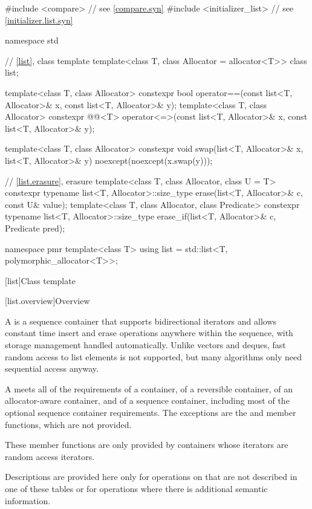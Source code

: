 %
\begin{codeblock}
#include <compare>              // see \ref{compare.syn}
#include <initializer_list>     // see \ref{initializer.list.syn}

namespace std {
  // \ref{list}, class template 
  template<class T, class Allocator = allocator<T>> class list;

  template<class T, class Allocator>
    constexpr bool operator==(const list<T, Allocator>& x, const list<T, Allocator>& y);
  template<class T, class Allocator>
    constexpr @@<T>
      operator<=>(const list<T, Allocator>& x, const list<T, Allocator>& y);

  template<class T, class Allocator>
    constexpr void swap(list<T, Allocator>& x, list<T, Allocator>& y)
      noexcept(noexcept(x.swap(y)));

  // \ref{list.erasure}, erasure
  template<class T, class Allocator, class U = T>
    constexpr typename list<T, Allocator>::size_type
      erase(list<T, Allocator>& c, const U& value);
  template<class T, class Allocator, class Predicate>
    constexpr typename list<T, Allocator>::size_type
      erase_if(list<T, Allocator>& c, Predicate pred);

  namespace pmr {
    template<class T>
      using list = std::list<T, polymorphic_allocator<T>>;
  }
}
\end{codeblock}

[list]{Class template }

[list.overview]{Overview}

\pnum
{}%
A
is a sequence container that supports
bidirectional iterators and allows constant time insert and erase
operations anywhere within the sequence, with storage management handled
automatically. Unlike vectors and deques,
fast random access to list elements is not supported, but many
algorithms only need sequential access anyway.

\pnum
A  meets all of the requirements
of a container,
of a reversible container,
of an allocator-aware container, and
of a sequence container,
including most of the optional sequence container
requirements.
The exceptions are the
and
member functions, which are not provided.
\begin{footnote}
These member functions
are only provided by containers whose iterators
are random access iterators.
\end{footnote}
Descriptions are provided here only for operations on
that are not described in one of these tables
or for operations where there is additional semantic information.

